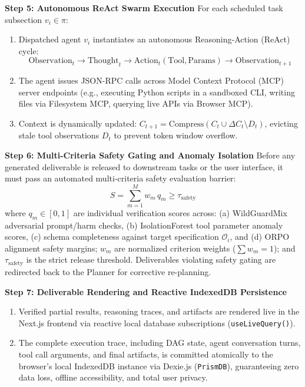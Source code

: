 \documentclass[11pt,a4paper]{article}
\begin{document}
\textbf{Step 5: Autonomous ReAct Swarm Execution}
For each scheduled task subsection $v_i \in \pi$:
\begin{enumerate}[leftmargin=1.8em, itemsep=0.06em, topsep=0.02em]
    \item Dispatched agent $v_i$ instantiates an autonomous Reasoning-Action (ReAct) cycle:
    \begin{equation*}
    \text{Observation}_t \longrightarrow \text{Thought}_t \longrightarrow \text{Action}_t(\text{Tool}, \text{Params}) \longrightarrow \text{Observation}_{t+1}
    \end{equation*}
    \item The agent issues JSON-RPC calls across Model Context Protocol (MCP) server endpoints (e.g., executing Python scripts in a sandboxed CLI, writing files via Filesystem MCP, querying live APIs via Browser MCP).
    \item Context is dynamically updated: $C_{t+1} = \mathrm{Compress}(C_t \cup \Delta C_t \setminus D_t)$, evicting stale tool observations $D_t$ to prevent token window overflow.
\end{enumerate}

\vspace{0.08em}
\textbf{Step 6: Multi-Criteria Safety Gating and Anomaly Isolation}
Before any generated deliverable is released to downstream tasks or the user interface, it must pass an automated multi-criteria safety evaluation barrier:
\begin{equation}
S = \sum_{m=1}^M w_m \, q_m \ge \tau_{\text{safety}}
\end{equation}
where $q_m \in [0, 1]$ are individual verification scores across: (a) WildGuardMix adversarial prompt/harm checks, (b) IsolationForest tool parameter anomaly scores, (c) schema completeness against target specification $\mathcal{O}_i$, and (d) ORPO alignment safety margins; $w_m$ are normalized criterion weights ($\sum w_m = 1$); and $\tau_{\text{safety}}$ is the strict release threshold. Deliverables violating safety gating are redirected back to the Planner for corrective re-planning.

\vspace{0.08em}
\textbf{Step 7: Deliverable Rendering and Reactive IndexedDB Persistence}
\begin{enumerate}[leftmargin=1.8em, itemsep=0.06em, topsep=0.02em]
    \item Verified partial results, reasoning traces, and artifacts are rendered live in the Next.js frontend via reactive local database subscriptions (\texttt{useLiveQuery()}).
    \item The complete execution trace, including DAG state, agent conversation turns, tool call arguments, and final artifacts, is committed atomically to the browser's local IndexedDB instance via Dexie.js (\texttt{PrismDB}), guaranteeing zero data loss, offline accessibility, and total user privacy.
\end{enumerate}
\end{document}
